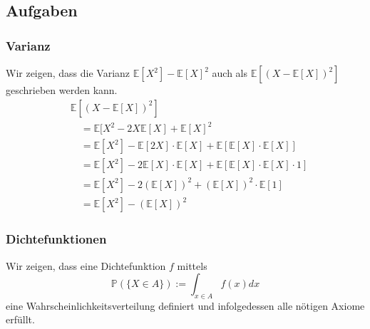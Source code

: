 \subsection{Aufgaben}
\subsubsection{Varianz}
Wir zeigen, dass die Varianz
 $\mathbb{E} [X^2] - \mathbb{E} [X]^2$ auch als $\mathbb{E} [(X- \mathbb{E} [X] )^2 ]$ geschrieben werden kann.	
\begin{align*}
&\mathbb{E} [(X- \mathbb{E} [X] )^2 ] \\
&\quad= \mathbb{E} [X^2 - 2X \mathbb{E} [X] + \mathbb{E} [X]^2 \\
&\quad= \mathbb{E} [X^2] - \mathbb{E} [2X]  \cdot \mathbb{E} [X] + \mathbb{E} [\mathbb{E} [X] \cdot \mathbb{E} [X]]\\
&\quad= \mathbb{E} [X^2] - 2\mathbb{E} [X] \cdot \mathbb{E} [X] +  \mathbb{E} [\mathbb{E} [X] \cdot \mathbb{E} [X] \cdot 1]\\
&\quad= \mathbb{E} [X^2] - 2(\mathbb{E} [X])^2 + (\mathbb{E} [X])^2 \cdot \mathbb{E} [1]\\
&\quad= \mathbb{E} [X^2] - (\mathbb{E} [X])^2
\end{align*}


\subsubsection{Dichtefunktionen}
Wir zeigen, dass eine Dichtefunktion $f$ mittels
\begin{equation*}
\mathbb{P}(\{X\in A\}):=\int_{x\in A}f(x)dx
\end{equation*}
eine Wahrscheinlichkeitsverteilung definiert und infolgedessen alle nötigen Axiome erfüllt.

